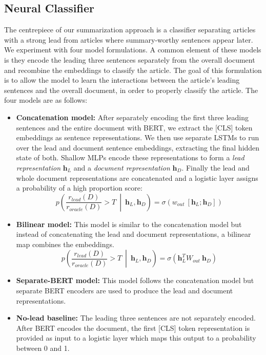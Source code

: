 \subsection{Neural Classifier}
The centrepiece of our summarization approach is a classifier separating articles with a strong lead from articles where summary-worthy sentences appear later. We experiment with four model formulations. A common element of these models is they encode the leading three sentences separately from the overall document and recombine the embeddings to classify the article. The goal of this formulation is to allow the model to learn the interactions between the article's leading sentences and the overall document, in order to properly classify the article. The four models are as follows:
\begin{itemize}
    \item \textbf{Concatenation model:} After separately encoding the first three leading sentences and the entire document with BERT, we extract the [CLS] token embeddings as sentence representations. We then use separate LSTMs to run over the lead and document sentence embeddings, extracting the final hidden state of both. Shallow MLPs encode these representations to form a \textit{lead representation} $\mathbf{h}_L$ and a \textit{document representation} $\mathbf{h}_D$. Finally the lead and whole document representations are concatenated and a logistic layer assigns a probability of a high proportion score:
    \begin{equation}
        p\left(\frac{r_{lead}(D)}{r_{oracle}(D)} > T \ \middle\vert\  \mathbf{h}_L, \mathbf{h}_D \right) = \sigma \left(w_{out}\ [ \mathbf{h}_L ; \mathbf{h}_D ] \right)
    \end{equation}
    
    \item \textbf{Bilinear model:} This model is similar to the concatenation model but instead of concatenating the lead and document representations, a bilinear map combines the embeddings.
    \begin{equation}
        p\left(\frac{r_{lead}(D)}{r_{oracle}(D)} > T \ \middle\vert\  \mathbf{h}_L, \mathbf{h}_D \right) = \sigma \left( \mathbf{h}_L^T W_{out}\ \mathbf{h}_D \right)
    \end{equation}
    
    \item \textbf{Separate-BERT model:} This model follows the concatenation model but separate BERT encoders are used to produce the lead and document representations.
    \item \textbf{No-lead baseline:} The leading three sentences are not separately encoded. After BERT encodes the document, the first [CLS] token representation is provided as input to a logistic layer which maps this output to a probability between 0 and 1.
\end{itemize}

